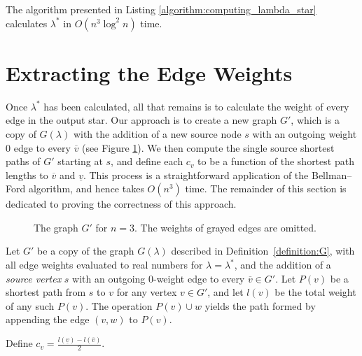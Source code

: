 \documentclass{llncs}
\def \figurescale {.85}
\begin{document}
\begin{theorem}
\label{theorem:lambda_star_algorithm}
The algorithm presented in Listing \ref{algorithm:computing_lambda_star} calculates $\lambda^*$ in $O(n^3 \log^2 n)$ time.
\end{theorem}


\section{Extracting the Edge Weights}
\label{section:extracting_weights}

Once $\lambda^*$ has been calculated, all that remains is to calculate the weight of every edge in the output star.  Our approach is to create a new graph $G'$, which is a copy of $G(\lambda)$ with the addition of a new source node $s$ with an outgoing weight 0 edge to every $\overline{v}$ (see Figure \ref{figure:G_prime}).  We then compute the single source shortest paths of $G'$ starting at $s$, and define each $c_v$ to be a function of the shortest path lengths to $\overline{v}$ and $\underline{v}$.  This process is a straightforward application of the Bellman--Ford algorithm, and hence takes $O(n^3)$ time.  The remainder of this section is dedicated to proving the correctness of this approach.

\begin{figure}
\centering
\scalebox{\figurescale}{\texttt{[image: G\_prime.eps]}}
\caption{The graph $G'$ for $n=3$.  The weights of grayed edges are omitted.}
\label{figure:G_prime}
\end{figure}


\begin{definition}
Let $G'$ be a copy of the graph $G(\lambda)$ described in Definition~\ref{definition:G}, with all edge weights evaluated to real numbers for $\lambda=\lambda^*$, and the addition of a \emph{source vertex} $s$ with an outgoing 0-weight edge to every $\overline{v} \in G'$.  Let $P(v)$ be a shortest path from $s$ to $v$ for any vertex $v \in G'$, and let $l(v)$ be the total weight of any such $P(v)$.  The operation $P(v) \cup w$ yields the path formed by appending the edge $(v,w)$ to $P(v)$.
\end{definition}

\begin{definition}
Define $c_v = \frac{l(\underline{v}) - l(\overline{v})}{2}.$
\end{definition}
\end{document}
